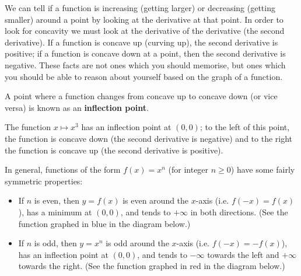 We can tell if a function is increasing (getting larger) or decreasing (getting smaller) around a point by looking at the derivative
at that point. In order to look for concavity we must look at the derivative of the derivative (the second derivative). If
a function is concave up (curving up), the second derivative is positive; if a function is concave down at a point, then the second
derivative is negative. These facts are not ones which you should memorise, but ones which you should be able to reason about yourself
based on the graph of a function.

A point where a function changes from concave up to concave down (or vice versa) is known as an \textbf{inflection point}.

\begin{ex}
  The function $ x \mapsto x^3 $ has an inflection point at $ (0,0) $; to the left of this point, the function is concave
  down (the second derivative is negative) and to the right the function is concave up (the second derivative is positive).

  In general, functions of the form $ f(x) = x^n $ (for integer $ n \geq 0 $) have some fairly symmetric properties:
  \begin{itemize}
    \item If $ n $ is even, then $ y = f(x) $ is even around the $ x $-axis (i.e. $ f(-x) = f(x) $), has a minimum at $ (0,0) $, and
          tends to $ +\infty $ in both directions. (See the function graphed in blue in the diagram below.)
    \item If $ n $ is odd, then $ y = x^n $ is odd around the $ x $-axis (i.e. $ f(-x) = -f(x) $), has an inflection point at $ (0,0) $,
          and tends to $ -\infty $ towards the left and $ +\infty $ towards the right. (See the function graphed in red in the diagram below.)
  \end{itemize}

  \begin{center}
  \end{center}
\end{ex}

